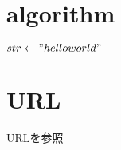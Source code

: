 \section{algorithm}
\begin{algorithmic}
    \State $str \gets "hello world"$
    \EndFor
    \EndFunction
\end{algorithmic}

\section{URL}
URL\cite{sagaweb}を参照